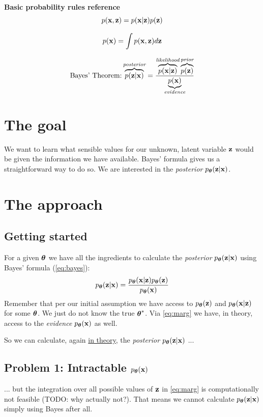\documentclass[11pt]{article}
\theoremstyle{definition}
\begin{document}
\begin{mdframed}
	{\Large \bf Basic probability rules reference}
		\begin{equation}
			p(\mathbf{x}, \mathbf{z}) = p(\mathbf{x}|\mathbf{z})p(\mathbf{z})
			\label{eq:joint}
		\end{equation}
		
		\begin{equation}
			p(\mathbf{x}) = \int p(\mathbf{x}, \mathbf{z}) d\mathbf{z}
			\label{eq:marg}
		\end{equation}
		
		\begin{equation}
		\text{Bayes' Theorem:} \overbrace{p(\mathbf{z}|\mathbf{x})}^{\textit{posterior}}=\frac{\overbrace{p(\mathbf{x}|\mathbf{z})}^{\textit{likelihood}}\overbrace{p(\mathbf{z})}^{\textit{prior}}}{\underbrace{p(\mathbf{x})}_{\textit{evidence}}}
		\label{eq:bayes}
		\end{equation}
\end{mdframed}


\section{The goal}
We want to learn what sensible values for our unknown, latent variable $\mathbf{z}$ would be given the information we have available. Bayes' formula gives us a straightforward way to do so. We are interested in the \textit{posterior} $p_{\boldsymbol{\theta}}(\mathbf{z}|\mathbf{x})$.

\section{The approach}
\subsection{Getting started}
For a given $\boldsymbol{\theta}$ we have all the ingredients to calculate the \textit{posterior} $p_{\boldsymbol{\theta}}(\mathbf{z}|\mathbf{x})$ using Bayes' formula (\autoref{eq:bayes}):
\begin{equation}
	p_{\boldsymbol{\theta}}(\mathbf{z}|\mathbf{x})=\frac{p_{\boldsymbol{\theta}}(\mathbf{x}|\mathbf{z})p_{\boldsymbol{\theta}}(\mathbf{z})}{p_{\boldsymbol{\theta}}(\mathbf{x})}
	\label{eq:bayes-post-theta}
\end{equation}
Remember that per our initial assumption we have access to $p_{\boldsymbol{\theta}}(\mathbf{z})$ and $p_{\boldsymbol{\theta}}(\mathbf{x}|\mathbf{z})$ for some $\boldsymbol{\theta}$. We just do not know the true $\boldsymbol{\theta}^*$. Via \autoref{eq:marg} we have, in theory, access to the \textit{evidence} $p_{\boldsymbol{\theta}}(\mathbf{x})$ as well.
\par
So we can calculate, again \underline{in theory}, the \textit{posterior} $p_{\boldsymbol{\theta}}(\mathbf{z}|\mathbf{x})$ ...

\subsection{Problem 1: Intractable  $p_{\boldsymbol{\theta}}(\mathbf{x})$}
... but the integration over all possible values of $\mathbf{z}$ in \autoref{eq:marg} is computationally not feasible (TODO: why actually not?). That means we cannot calculate $p_{\boldsymbol{\theta}}(\mathbf{z}|\mathbf{x})$ simply using Bayes after all.
\end{document}
